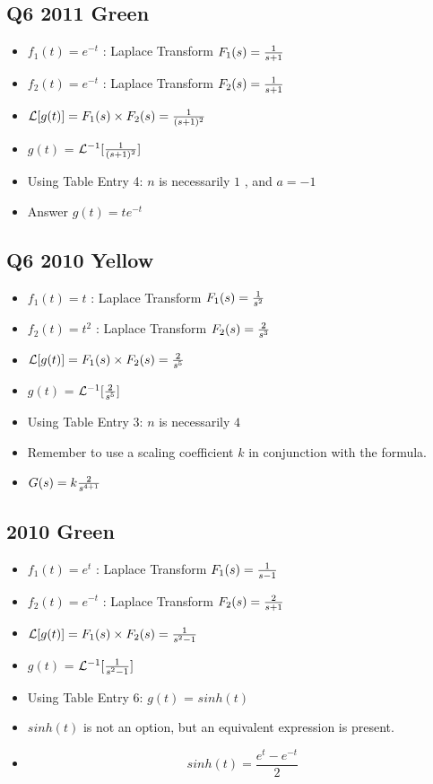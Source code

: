 \documentclass[11pt,a4paper,titlepage,oneside,openany]{article}
\numberwithin{equation}{section}
\numberwithin{algorithm}{section}
\numberwithin{figure}{section}
\numberwithin{table}{section}
\begin{document}
\subsection*{Q6 2011 Green}
\begin{itemize}
\item $f_1(t)=e^{-t}$ : Laplace Transform $F_1(s)={1 \over s+1}$
\item $f_2(t)=e^{-t}$ : Laplace Transform $F_2(s)={1 \over s+1}$
\item $\mathcal{L}[g(t)] = F_1(s)\times F_2(s) = {1 \over (s+1)^2}$
\item $g(t)$ = $\mathcal{L}^{-1}[{1 \over (s+1)^2}]$
\item Using Table Entry 4: $n$ is necessarily $1$ , and $a=-1$
\item Answer $g(t) = te^{-t}$
\end{itemize}

\subsection*{Q6 2010 Yellow}

\begin{itemize}
\item $f_1(t)=t$ : Laplace Transform $F_1(s)={1 \over s^2}$
\item $f_2(t)=t^2$ : Laplace Transform $F_2(s)={2 \over s^3}$
\item $\mathcal{L}[g(t)] = F_1(s)\times F_2(s) = {2 \over s^5}$
\item $g(t)$ = $\mathcal{L}^{-1}[{2 \over s^5}]$
\item Using Table Entry 3: $n$ is necessarily $4$
\item Remember to use a scaling coefficient $k$ in conjunction with the formula.
\item $G(s) = k { 2 \over s^{4+1}}$
\end{itemize}
\subsection*{2010 Green}

\begin{itemize}
\item $f_1(t)=e^t$ : Laplace Transform $F_1(s)={1 \over s-1}$
\item $f_2(t)=e^{-t}$ : Laplace Transform $F_2(s)={2 \over s+1}$
\item $\mathcal{L}[g(t)] = F_1(s)\times F_2(s) = {1 \over s^2-1}$
\item $g(t)$ = $\mathcal{L}^{-1}[{1 \over s^2-1}]$
\item Using Table Entry 6: $g(t)$ = $sinh(t)$
\item $sinh(t)$ is not an option, but an equivalent expression is present.
\item \[ sinh(t) = \frac{e^t - e^{-t}}{2} \]
\end{itemize}
\newpage
\end{document}
